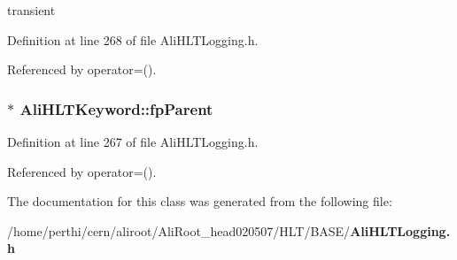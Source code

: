 transient 



Definition at line 268 of file Ali\-HLTLogging.h.

Referenced by operator=().
\subsubsection{$\ast$ {\bf Ali\-HLTKeyword::fp\-Parent}\hspace{0.3cm}{\tt  [private]}}\label{classAliHLTKeyword_r0}




Definition at line 267 of file Ali\-HLTLogging.h.

Referenced by operator=().

The documentation for this class was generated from the following file:\begin{CompactItemize}
\item 
/home/perthi/cern/aliroot/Ali\-Root\_\-head020507/HLT/BASE/{\bf Ali\-HLTLogging.h}\end{CompactItemize}
